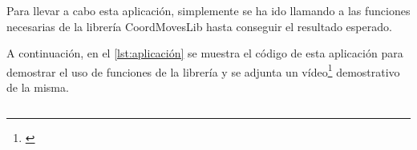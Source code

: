 Para llevar a cabo esta aplicación, simplemente se ha ido llamando a las funciones necesarias de la librería CoordMovesLib hasta conseguir el resultado esperado.

A continuación, en el \autoref{lst:aplicación} se muestra el código de esta aplicación para demostrar el uso de funciones de la librería y se adjunta un vídeo\footnote{\url{}} demostrativo de la misma.

\begin{lstlisting}[language=Python, caption={Aplicación GreenNao}, label={lst:aplicación}, numbers=left, backgroundcolor=\color{gray!10}]    
\end{lstlisting}